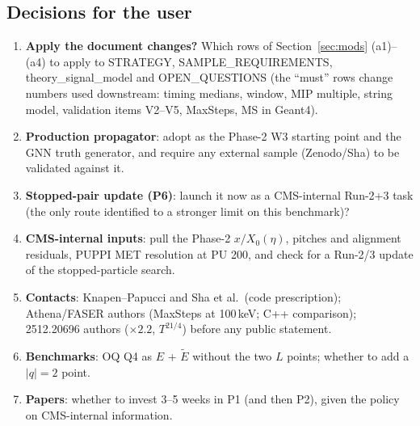 \documentclass[11pt,a4paper]{article}
\DeclareRobustCommand{\file}[1]{\path{#1}}
\begin{document}
\subsection{Decisions for the user}\label{sec:decisions}
\begin{enumerate}
\item \textbf{Apply the document changes?} Which rows of Section~\ref{sec:mods} (a1)--(a4) to apply to STRATEGY, SAMPLE\_REQUIREMENTS, theory\_signal\_model and OPEN\_QUESTIONS (the ``must'' rows change numbers used downstream: timing medians, window, MIP multiple, string model, validation items V2--V5, MaxSteps, MS in Geant4).
\item \textbf{Production propagator}: adopt \file{T3_causal.py} as the Phase-2 W3 starting point and the GNN truth generator, and require any external sample (Zenodo/Sha) to be validated against it.
\item \textbf{Stopped-pair update (P6)}: launch it now as a CMS-internal Run-2+3 task (the only route identified to a stronger limit on this benchmark)?
\item \textbf{CMS-internal inputs}: pull the Phase-2 $x/X_0(\eta)$, pitches and alignment residuals, PUPPI MET resolution at PU 200, and check for a Run-2/3 update of the stopped-particle search.
\item \textbf{Contacts}: Knapen--Papucci and Sha et al.\ (code prescription); Athena/FASER authors (MaxSteps at 100\,keV; C++ comparison); 2512.20696 authors ($\times2.2$, $T^{21/4}$) before any public statement.
\item \textbf{Benchmarks}: OQ Q4 as $E$ + $\tilde E$ without the two $L$ points; whether to add a $|q|=2$ point.
\item \textbf{Papers}: whether to invest 3--5 weeks in P1 (and then P2), given the policy on CMS-internal information.
\end{enumerate}

\appendix
\end{document}
